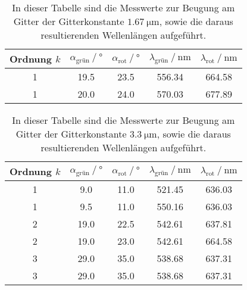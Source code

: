 \begin{table}
  \centering
  \caption{In dieser Tabelle sind die Messwerte zur Beugung am Gitter der Gitterkonstante $\qty{1.67}{\micro\metre}$, sowie die daraus resultierenden Wellenlängen aufgeführt.}
  \label{tab:Beugung600}
  \begin{tabular}{c S[table-format = 2.1] S[table-format = 2.1] S[table-format = 3.2] S[table-format = 3.2]}
    \toprule
    {Ordnung $k$} & {$\alpha_{\text{grün}} \mathbin{/}\unit{\degree}$} & {$\alpha_{\text{rot}} \mathbin{/}\unit{\degree}$} & {$\lambda_{\text{grün}} \mathbin{/}\unit{\nano\metre}$} & {$\lambda_{\text{rot}} \mathbin{/}\unit{\nano\metre}$}\\
       & 19.5 & 23.5 & 556.34 & 664.58 \\
      1 & 20.0 & 24.0 & 570.03 & 677.89 \\
      \bottomrule
  \end{tabular}
\end{table}

\begin{table}
  \centering
  \caption{In dieser Tabelle sind die Messwerte zur Beugung am Gitter der Gitterkonstante $\qty{3.3}{\micro\metre}$, sowie die daraus resultierenden Wellenlängen aufgeführt.}
  \label{tab:Beugung300}
  \begin{tabular}{c S[table-format = 2.1] S[table-format = 2.1] S[table-format = 3.2] S[table-format = 3.2]}
    \toprule
    {Ordnung $k$} & {$\alpha_{\text{grün}} \mathbin{/}\unit{\degree}$} & {$\alpha_{\text{rot}} \mathbin{/}\unit{\degree}$} & {$\lambda_{\text{grün}} \mathbin{/}\unit{\nano\metre}$} & {$\lambda_{\text{rot}} \mathbin{/}\unit{\nano\metre}$}\\
      \midrule
      
      1 & 9.0  & 11.0 & 521.45 & 636.03 \\
      1 & 9.5  & 11.0 & 550.16 & 636.03 \\
      2 & 19.0 & 22.5 & 542.61 & 637.81 \\
    	2 & 19.0 & 23.0 & 542.61 & 664.58 \\    
    	3 & 29.0 & 35.0 & 538.68 & 637.31 \\
    	3 & 29.0 & 35.0 & 538.68 & 637.31 \\

      \bottomrule
  \end{tabular}
\end{table}

